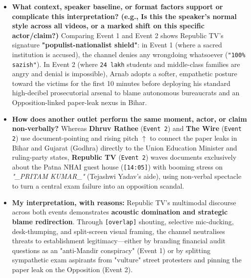 \documentclass[10pt,a4paper]{article}
\begin{document}
\begin{itemize}
His non-verbal cues \textbf{dramatise bureaucratic failure} (pen-jabbing on \textit{"NTA babus"}), \textbf{soften central government culpability} (calm, reassuring nods when mentioning the CBI probe at \texttt{[16:22]}), \textbf{invert street protests via visual pointing} (pointing at party flags to rebrand protesters as \textit{"Congress cadres"} at \texttt{[20:25]}), and \textbf{implicate the Opposition via dramatic \texttt{(1.5)} pauses and trailing off} (\texttt{...} at \texttt{[14:48]}).\par\smallskip
  \item \textbf{What context, speaker baseline, or format factors support or complicate this interpretation? (e.g., Is this the speaker's normal style across all videos, or a marked shift on this specific actor/claim?)}
Comparing Event 1 and Event 2 shows Republic TV's signature \textbf{"populist-nationalist shield"}: in Event 1 (where a sacred institution is accused), the channel denies any wrongdoing whatsoever (\texttt{"100\% sazish"}). In Event 2 (where \texttt{24 lakh} students and middle-class families are angry and denial is impossible), Arnab adopts a softer, empathetic posture toward the victims for the first 10 minutes before deploying his standard high-decibel prosecutorial arsenal to blame autonomous bureaucrats and an Opposition-linked paper-leak nexus in Bihar.\par\smallskip
  \item \textbf{How does another outlet perform the same moment, actor, or claim non-verbally?}
Whereas \textbf{Dhruv Rathee} (\texttt{Event 2}) and \textbf{The Wire} (\texttt{Event 2}) use document-pointing and rising pitch \texttt{$\uparrow$} to connect the paper leaks in Bihar and Gujarat (Godhra) directly to the Union Education Minister and ruling-party states, \textbf{Republic TV} (\texttt{Event 2}) waves documents exclusively about the Patna NHAI guest house (\texttt{[14:05]}) with booming stress on \textit{"\_PRITAM KUMAR\_"} (Tejashwi Yadav's aide), using non-verbal spectacle to turn a central exam failure into an opposition scandal.\par\smallskip
  \item \textbf{My interpretation, with reasons:}
Republic TV's multimodal discourse across both events demonstrates \textbf{acoustic domination and strategic blame redirection}. Through \texttt{[overlap]} shouting, selective mic-ducking, desk-thumping, and split-screen visual framing, the channel neutralises threats to establishment legitimacy---either by branding financial audit questions as an "anti-Mandir conspiracy" (Event 1) or by splitting sympathetic exam aspirants from "vulture" street protesters and pinning the paper leak on the Opposition (Event 2).\par\smallskip
\end{itemize}
\newpage
\end{document}
